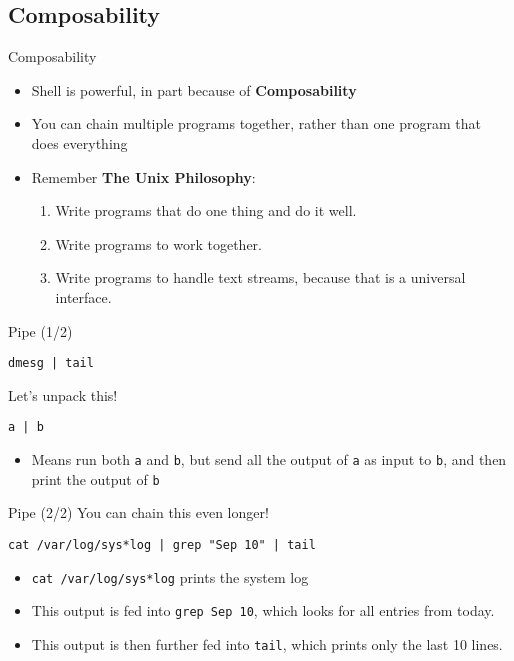 \documentclass[12pt]{beamer}
\begin{document}
\subsection{Composability}
\begin{frame}{Composability}
  \begin{itemize}
    \item Shell is powerful, in part because of \textbf{Composability}
    \item You can chain multiple programs together, rather than one program that does everything
    \item Remember \textbf{The Unix Philosophy}:
          \begin{enumerate}
            \item Write programs that do one thing and do it well.
            \item Write programs to work together.
            \item Write programs to handle text streams, because that is a universal interface.
          \end{enumerate}
  \end{itemize}
\end{frame}

\begin{frame}[fragile]{Pipe (1/2)}
  \begin{verbatim}
dmesg | tail
  \end{verbatim}
  Let's unpack this!

  \texttt{a | b}
  \begin{itemize}
    \item Means run both \texttt{a} and \texttt{b}, but send all the output of \texttt{a} as input to \texttt{b}, and then print the output of \texttt{b}
  \end{itemize}
\end{frame}

\begin{frame}[fragile]{Pipe (2/2)}
  You can chain this even longer!

  \texttt{cat /var/log/sys*log | grep "Sep 10" | tail}
  \begin{itemize}
    \item \texttt{cat /var/log/sys*log} prints the system log
    \item This output is fed into \texttt{grep Sep 10}, which looks for all entries from today.
    \item This output is then further fed into \texttt{tail}, which prints only the last 10 lines.
  \end{itemize}
\end{frame}
\end{document}
